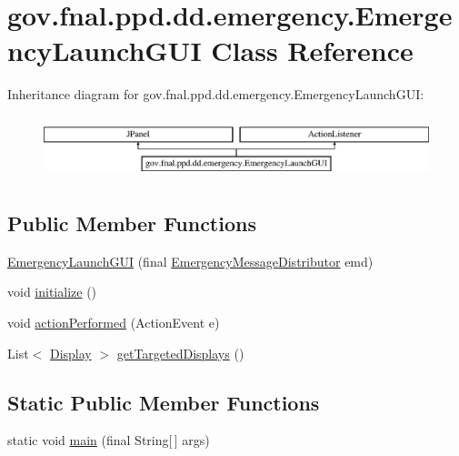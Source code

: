 \hypertarget{classgov_1_1fnal_1_1ppd_1_1dd_1_1emergency_1_1EmergencyLaunchGUI}{\section{gov.\-fnal.\-ppd.\-dd.\-emergency.\-Emergency\-Launch\-G\-U\-I Class Reference}
\label{classgov_1_1fnal_1_1ppd_1_1dd_1_1emergency_1_1EmergencyLaunchGUI}
}
Inheritance diagram for gov.\-fnal.\-ppd.\-dd.\-emergency.\-Emergency\-Launch\-G\-U\-I\-:\begin{figure}[H]
\begin{center}
\leavevmode
\includegraphics[height=1.830065cm]{classgov_1_1fnal_1_1ppd_1_1dd_1_1emergency_1_1EmergencyLaunchGUI}
\end{center}
\end{figure}
\subsection*{Public Member Functions}
\begin{DoxyCompactItemize}
\item 
\hyperlink{classgov_1_1fnal_1_1ppd_1_1dd_1_1emergency_1_1EmergencyLaunchGUI_ada7b11d41e8fde113dfaf0e483dc58d6}{Emergency\-Launch\-G\-U\-I} (final \hyperlink{interfacegov_1_1fnal_1_1ppd_1_1dd_1_1emergency_1_1EmergencyMessageDistributor}{Emergency\-Message\-Distributor} emd)
\item 
void \hyperlink{classgov_1_1fnal_1_1ppd_1_1dd_1_1emergency_1_1EmergencyLaunchGUI_a37456dacf8b47f32406a1803e50a0615}{initialize} ()
\item 
void \hyperlink{classgov_1_1fnal_1_1ppd_1_1dd_1_1emergency_1_1EmergencyLaunchGUI_a95c444847473b12b1323b5c954e15e67}{action\-Performed} (Action\-Event e)
\item 
List$<$ \hyperlink{interfacegov_1_1fnal_1_1ppd_1_1dd_1_1signage_1_1Display}{Display} $>$ \hyperlink{classgov_1_1fnal_1_1ppd_1_1dd_1_1emergency_1_1EmergencyLaunchGUI_a1932baa3595f9d2fed1984a3a2a21c25}{get\-Targeted\-Displays} ()
\end{DoxyCompactItemize}
\subsection*{Static Public Member Functions}
\begin{DoxyCompactItemize}
\item 
static void \hyperlink{classgov_1_1fnal_1_1ppd_1_1dd_1_1emergency_1_1EmergencyLaunchGUI_a182c4fee71b9dd4d099e75f2c1a44646}{main} (final String\mbox{[}$\,$\mbox{]} args)
\end{DoxyCompactItemize}
